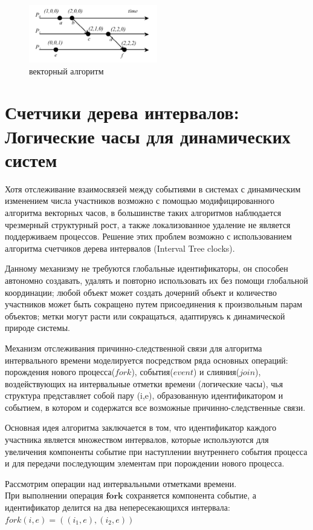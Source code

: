\begin{figure}
\centering
\includegraphics[width=0.5\textwidth]{img/vector.jpg}
\caption{векторный алгоритм}
\end{figure}

\section{Счетчики дерева интервалов: Логические часы для динамических систем}
Хотя отслеживание взаимосвязей между событиями в системах с динамическим изменением числа участников возможно с помощью модифицированного алгоритма векторных часов, в большинстве таких алгоритмов наблюдается чрезмерный структурный рост, а также локализованное удаление не является поддерживаем процессов.  Решение этих проблем возможно с использованием алгоритма счетчиков дерева интервалов (Interval Tree clocks).\par
Данному механизму не требуются глобальные идентификаторы, он способен автономно создавать, удалять и повторно использовать их без помощи глобальной координации; любой объект может создать дочерний объект и количество участников может быть сокращено путем присоединения к произвольным парам объектов; метки могут расти или сокращаться, адаптируясь к динамической природе системы.\par
Механизм отслеживания причинно-следственной связи для алгоритма интервального времени моделируется посредством ряда основных операций: порождения нового процесса($fork$), события($event$) и слияния($join$), воздействующих на интервальные отметки времени (логические часы), чья структура представляет собой пару (i,e), образованную идентификатором и событием, в котором и содержатся все возможные причинно-следственные связи.\par
Основная идея алгоритма заключается в том, что идентификатор каждого участника является множеством интервалов, которые используются для увеличения компоненты событие при наступлении внутреннего события процесса и для передачи последующим элементам при порождении нового процесса.\par 
Рассмотрим операции над интервальными отметками времени.\\
При выполнении операция $\textbf{fork}$ сохраняется компонента событие, а идентификатор делится на два непересекающихся интервала: $fork(i,e) = ((i_1,e),(i_2,e))$  
